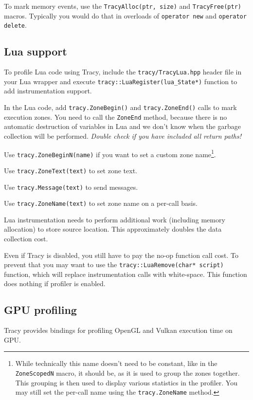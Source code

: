 \documentclass[hidelinks,titlepage,a4paper]{article}
\begin{document}
To mark memory events, use the \texttt{TracyAlloc(ptr, size)} and \texttt{TracyFree(ptr)} macros. Typically you would do that in overloads of \texttt{operator new} and \texttt{operator delete}.

\subsection{Lua support}

To profile Lua code using Tracy, include the \texttt{tracy/TracyLua.hpp} header file in your Lua wrapper and execute \texttt{tracy::LuaRegister(lua\_State*)} function to add instrumentation support.

In the Lua code, add \texttt{tracy.ZoneBegin()} and \texttt{tracy.ZoneEnd()} calls to mark execution zones. You need to call the \texttt{ZoneEnd} method, because there is no automatic destruction of variables in Lua and we don't know when the garbage collection will be performed. \emph{Double check if you have included all return paths!}

Use \texttt{tracy.ZoneBeginN(name)} if you want to set a custom zone name\footnote{While technically this name doesn't need to be constant, like in the \texttt{ZoneScopedN} macro, it should be, as it is used to group the zones together. This grouping is then used to display various statistics in the profiler. You may still set the per-call name using the \texttt{tracy.ZoneName} method.}.

Use \texttt{tracy.ZoneText(text)} to set zone text.

Use \texttt{tracy.Message(text)} to send messages.

Use \texttt{tracy.ZoneName(text)} to set zone name on a per-call basis.

Lua instrumentation needs to perform additional work (including memory allocation) to store source location. This approximately doubles the data collection cost.

Even if Tracy is disabled, you still have to pay the no-op function call cost. To prevent that you may want to use the \texttt{tracy::LuaRemove(char* script)} function, which will replace instrumentation calls with white-space. This function does nothing if profiler is enabled.

\subsection{GPU profiling}

Tracy provides bindings for profiling OpenGL and Vulkan execution time on GPU.
\end{document}

